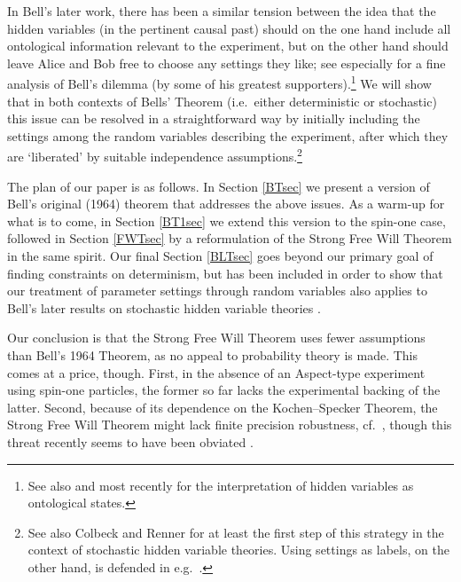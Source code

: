 \documentclass[12pt]{article}
\begin{document}
 In  Bell's later work, there has  been a similar tension between the idea that the hidden variables (in the pertinent causal past) should on the one hand include all ontological information relevant to the experiment, but on the other hand should leave Alice and Bob free to choose any settings they like; see especially \cite{Norsen1,SU} for a fine analysis of Bell's  dilemma (by some of his greatest supporters).\footnote{See also \cite{Bell4,JB} and most recently \cite{Leifer} for the interpretation of hidden variables as ontological states.}
 We will show that in both contexts of Bells' Theorem (i.e.\ either deterministic or stochastic) this issue can be resolved in a straightforward way  by initially including the settings among the random variables describing the experiment, after which they are `liberated'  by suitable independence assumptions.\footnote{See also Colbeck and Renner \cite{CR1} for at least the first step of this strategy in the context of stochastic hidden variable theories. Using settings as labels, on the other hand, is defended in e.g.\ \cite{Bub,JB,SU}.}
  
The plan of our paper is as follows. In  Section \ref{BTsec} we present a version of Bell's original (1964) theorem \cite{Bell1} that addresses the above issues. As a warm-up for what is to come, in Section  \ref{BT1sec} we extend this version to the spin-one case, followed  in Section \ref{FWTsec} by a reformulation of the Strong Free Will Theorem \cite{CK2} in the same spirit. Our final Section \ref{BLTsec} goes beyond our primary goal of finding constraints on determinism, but has been included in order to show that our treatment of parameter settings through random variables also applies to Bell's later results on stochastic hidden variable theories \cite{Bell4,Bub,JB,Gill,Jaeger,Maudlin,Seevinck,Wiseman}.

Our conclusion is  that the Strong Free Will Theorem uses fewer assumptions than Bell's 1964 Theorem, as no appeal to probability theory is made.  This comes at a price, though. First, in the absence of an Aspect-type experiment using spin-one particles, the former so far lacks the experimental backing of the latter. Second, because of its dependence  on the Kochen--Specker Theorem, the Strong Free Will Theorem might lack finite precision robustness, cf.\  \cite{Appleby,BK,Hermens}, though this threat recently seems to have been obviated \cite{Hermens2}.
\end{document}
